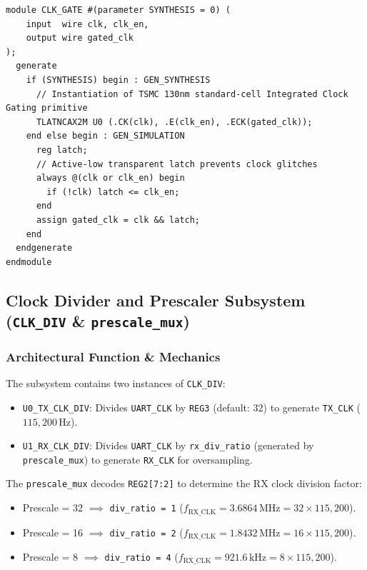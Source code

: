 \documentclass[11pt,a4paper]{article}
\begin{document}
\begin{lstlisting}[caption={RTL Implementation of the Integrated Clock Gating Cell (CLK\_GATE.v).}]
module CLK_GATE #(parameter SYNTHESIS = 0) (
    input  wire clk, clk_en,
    output wire gated_clk
);
  generate
    if (SYNTHESIS) begin : GEN_SYNTHESIS
      // Instantiation of TSMC 130nm standard-cell Integrated Clock Gating primitive
      TLATNCAX2M U0 (.CK(clk), .E(clk_en), .ECK(gated_clk));
    end else begin : GEN_SIMULATION
      reg latch;
      // Active-low transparent latch prevents clock glitches
      always @(clk or clk_en) begin
        if (!clk) latch <= clk_en;
      end
      assign gated_clk = clk && latch;
    end
  endgenerate
endmodule
\end{lstlisting}

\subsection{Clock Divider and Prescaler Subsystem (\texttt{CLK\_DIV} \& \texttt{prescale\_mux})}

\subsubsection{Architectural Function \& Mechanics}
The subsystem contains two instances of \texttt{CLK\_DIV}:
\begin{itemize}
    \item \texttt{U0\_TX\_CLK\_DIV}: Divides \texttt{UART\_CLK} by \texttt{REG3} (default: $32$) to generate \texttt{TX\_CLK} ($115,200\,\text{Hz}$).
    \item \texttt{U1\_RX\_CLK\_DIV}: Divides \texttt{UART\_CLK} by \texttt{rx\_div\_ratio} (generated by \texttt{prescale\_mux}) to generate \texttt{RX\_CLK} for oversampling.
\end{itemize}

The \texttt{prescale\_mux} decodes \texttt{REG2[7:2]} to determine the RX clock division factor:
\begin{itemize}
    \item Prescale = 32 $\implies$ \texttt{div\_ratio = 1} ($f_{\text{RX\_CLK}} = 3.6864\,\text{MHz} = 32 \times 115,200$).
    \item Prescale = 16 $\implies$ \texttt{div\_ratio = 2} ($f_{\text{RX\_CLK}} = 1.8432\,\text{MHz} = 16 \times 115,200$).
    \item Prescale = 8 $\implies$ \texttt{div\_ratio = 4} ($f_{\text{RX\_CLK}} = 921.6\,\text{kHz} = 8 \times 115,200$).
\end{itemize}
\end{document}
